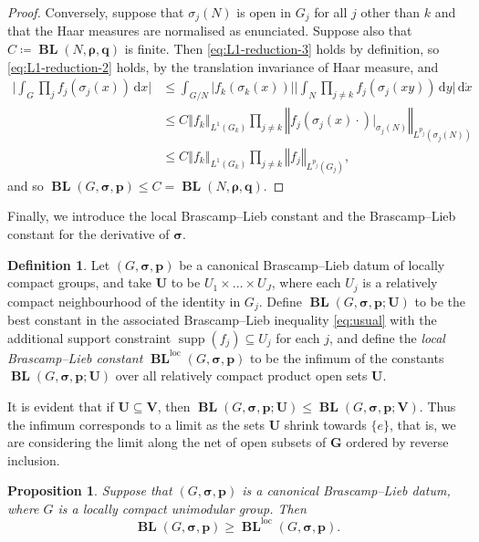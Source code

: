 \documentclass[12pt,twoside,a4paper]{amsart}
\newtheorem{prop}[thm]{Proposition}%
\theoremstyle{definition}
\newtheorem{defn}[thm]{Definition}%
\theoremstyle{remark}
\numberwithin{equation}{section}
\newcommand{\supp}{\operatorname{supp}}
\newcommand{\loc}{\mathrm{loc}}
\newcommand{\wrt}[1]{\,\mathrm{d} #1}
\newcommand{\BL}{\operatorname{\mathbf{BL}}}
\newcommand{\bss}{\boldsymbol{\sigma}}
\newcommand{\bsrho}{\boldsymbol{\rho}}
\newcommand{\bsp}{\boldsymbol{p}}
\newcommand{\bsq}{\boldsymbol{q}}
\newcommand{\bsG}{\boldsymbol{G}}
\newcommand{\bsU}{\boldsymbol{U}}
\newcommand{\bsV}{\boldsymbol{V}}
\newcommand{\norm}[1]{\left\Vert #1 \right\Vert}
\newcommand{\bigglabs}{\biggl\vert}
\newcommand{\biggrabs}{\biggr\vert}
\begin{document}
\begin{proof}
Conversely, suppose that $\sigma_j(N)$ is open in $G_j$ for all $j$ other than $k$ and that the Haar measures are normalised as enunciated.
Suppose also that $C \coloneqq  \BL(N, \bsrho, \bsq)$ is finite.
Then \eqref{eq:L1-reduction-3} holds by definition, so \eqref{eq:L1-reduction-2} holds, by the translation invariance of Haar measure, and 
\[
\begin{aligned}
\bigglabs\int_{G} \prod_{j} f_j(\sigma_j(x)) \wrt{x} \biggrabs
&\leq \int_{G/N} |f_k(\sigma_k(x))| \bigglabs \int_{N} \prod_{j\neq k} f_j(\sigma_j(xy)) \wrt{y} \biggrabs \wrt{\dot{x}} \\
&\leq C \norm{f_k}_{L^1(G_k)} \prod_{j\neq k} \norm{ f_j (\sigma_j(x) \cdot)|_{\sigma_j(N)} }_{L^{p_j}(\sigma_j(N))}\\
&\leq C \norm{f_k}_{L^1(G_k)} \prod_{j\neq k} \norm{ f_j }_{L^{p_j}(G_j)},
\end{aligned}
\]
and so $\BL(G,\bss,\bsp) \leq C = \BL(N,\bsrho,\bsq)$.
\end{proof}


Finally, we introduce the local Brascamp--Lieb constant and the Brascamp--Lieb constant for the derivative of $\bss$.

\begin{defn}
Let $(G, \bss ,\bsp )$ be a canonical Brascamp--Lieb datum of locally compact groups, and 
take $\bsU$ to be $U_1 \times \dots \times U_J$, where each $U_j$ is a relatively compact neighbourhood of the identity in $G_j$. 
Define $\BL(G,\bss ,\bsp ;\bsU)$ to be the best constant in the associated Brascamp--Lieb inequality \eqref{eq:usual} with the additional support constraint $\supp(f_j)\subseteq U_j$ for each $j$, and define the \emph{local Brascamp--Lieb constant} $\BL^{\loc}(G,\bss ,\bsp)$ to be the infimum of the constants $\BL(G,\bss ,\bsp ;\bsU)$ over all relatively compact product open sets $\bsU$.
\end{defn}

It is evident that if $\bsU \subseteq \bsV$, then $\BL(G,\bss,\bsp; \bsU) \leq \BL(G,\bss,\bsp; \bsV)$.
Thus the infimum corresponds to a limit as the sets $\bsU$ shrink towards $\{e\}$, that is, we are considering the limit along the net of open subsets of $\bsG$ ordered by reverse inclusion.

\begin{prop} \label{prop:trivial-estimate}
Suppose that  $(G, \bss ,\bsp )$ is a canonical Brascamp--Lieb datum, where $G$ is a locally compact unimodular group.
Then
\[
\BL(G,\bss ,\bsp) \geq \BL^{\loc}(G,\bss ,\bsp) .
\]
\end{prop}
\end{document}
